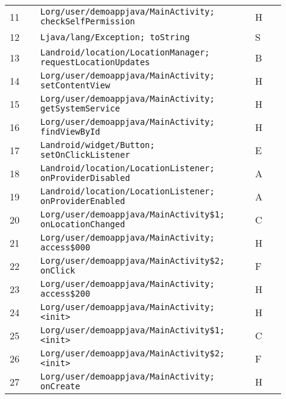 \begin{table}[h]
\begin{tabular}{@{}p{0.1\linewidth}p{0.7\linewidth}p{0.1\linewidth}@{}}
11                               & \texttt{Lorg/user/demoappjava/MainActivity; checkSelfPermission}   & H           \\
12                               & \texttt{Ljava/lang/Exception; toString}                            & S           \\
13                               & \texttt{Landroid/location/LocationManager; requestLocationUpdates} & B           \\
14                               & \texttt{Lorg/user/demoappjava/MainActivity; setContentView}        & H           \\
15                               & \texttt{Lorg/user/demoappjava/MainActivity; getSystemService}      & H           \\
16                               & \texttt{Lorg/user/demoappjava/MainActivity; findViewById}          & H           \\
17                               & \texttt{Landroid/widget/Button; setOnClickListener}                & E           \\
18                               & \texttt{Landroid/location/LocationListener; onProviderDisabled}    & A           \\
19                               & \texttt{Landroid/location/LocationListener; onProviderEnabled}     & A           \\
20                               & \texttt{Lorg/user/demoappjava/MainActivity\$1; onLocationChanged}   & C           \\
21                               & \texttt{Lorg/user/demoappjava/MainActivity; access\$000}            & H           \\
22                               & \texttt{Lorg/user/demoappjava/MainActivity\$2; onClick}             & F           \\
23                               & \texttt{Lorg/user/demoappjava/MainActivity; access\$200}            & H           \\
24                               & \texttt{Lorg/user/demoappjava/MainActivity; <init>}                & H           \\
25                               & \texttt{Lorg/user/demoappjava/MainActivity\$1; <init>}              & C           \\
26                               & \texttt{Lorg/user/demoappjava/MainActivity\$2; <init>}              & F           \\
27                               & \texttt{Lorg/user/demoappjava/MainActivity; onCreate}              & H           \\

\end{tabular}
\end{table}

